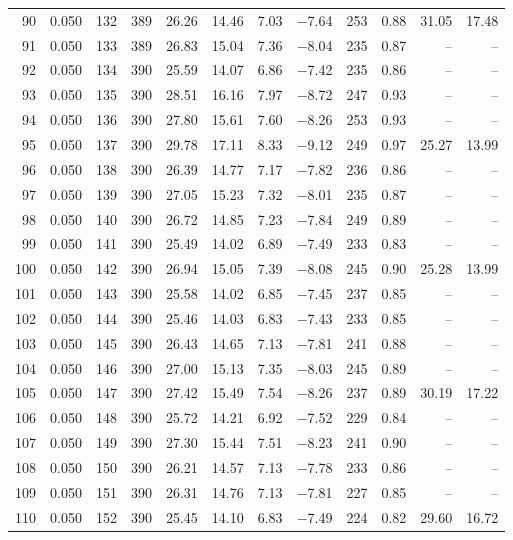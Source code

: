 \begin{table}[H]
\begin{tabular}{rrrrrrrrrrrr}
90 & 0.050 & 132 & 389 & 26.26 & 14.46 & 7.03 & $-$7.64 & 253 & 0.88 & 31.05 & 17.48 \\
91 & 0.050 & 133 & 389 & 26.83 & 15.04 & 7.36 & $-$8.04 & 235 & 0.87 & -- & -- \\
92 & 0.050 & 134 & 390 & 25.59 & 14.07 & 6.86 & $-$7.42 & 235 & 0.86 & -- & -- \\
93 & 0.050 & 135 & 390 & 28.51 & 16.16 & 7.97 & $-$8.72 & 247 & 0.93 & -- & -- \\
94 & 0.050 & 136 & 390 & 27.80 & 15.61 & 7.60 & $-$8.26 & 253 & 0.93 & -- & -- \\
95 & 0.050 & 137 & 390 & 29.78 & 17.11 & 8.33 & $-$9.12 & 249 & 0.97 & 25.27 & 13.99 \\
96 & 0.050 & 138 & 390 & 26.39 & 14.77 & 7.17 & $-$7.82 & 236 & 0.86 & -- & -- \\
97 & 0.050 & 139 & 390 & 27.05 & 15.23 & 7.32 & $-$8.01 & 235 & 0.87 & -- & -- \\
98 & 0.050 & 140 & 390 & 26.72 & 14.85 & 7.23 & $-$7.84 & 249 & 0.89 & -- & -- \\
99 & 0.050 & 141 & 390 & 25.49 & 14.02 & 6.89 & $-$7.49 & 233 & 0.83 & -- & -- \\
100 & 0.050 & 142 & 390 & 26.94 & 15.05 & 7.39 & $-$8.08 & 245 & 0.90 & 25.28 & 13.99 \\
101 & 0.050 & 143 & 390 & 25.58 & 14.02 & 6.85 & $-$7.45 & 237 & 0.85 & -- & -- \\
102 & 0.050 & 144 & 390 & 25.46 & 14.03 & 6.83 & $-$7.43 & 233 & 0.85 & -- & -- \\
103 & 0.050 & 145 & 390 & 26.43 & 14.65 & 7.13 & $-$7.81 & 241 & 0.88 & -- & -- \\
104 & 0.050 & 146 & 390 & 27.00 & 15.13 & 7.35 & $-$8.03 & 245 & 0.89 & -- & -- \\
105 & 0.050 & 147 & 390 & 27.42 & 15.49 & 7.54 & $-$8.26 & 237 & 0.89 & 30.19 & 17.22 \\
106 & 0.050 & 148 & 390 & 25.72 & 14.21 & 6.92 & $-$7.52 & 229 & 0.84 & -- & -- \\
107 & 0.050 & 149 & 390 & 27.30 & 15.44 & 7.51 & $-$8.23 & 241 & 0.90 & -- & -- \\
108 & 0.050 & 150 & 390 & 26.21 & 14.57 & 7.13 & $-$7.78 & 233 & 0.86 & -- & -- \\
109 & 0.050 & 151 & 390 & 26.31 & 14.76 & 7.13 & $-$7.81 & 227 & 0.85 & -- & -- \\
110 & 0.050 & 152 & 390 & 25.45 & 14.10 & 6.83 & $-$7.49 & 224 & 0.82 & 29.60 & 16.72 \\

\end{tabular}
\end{table}
